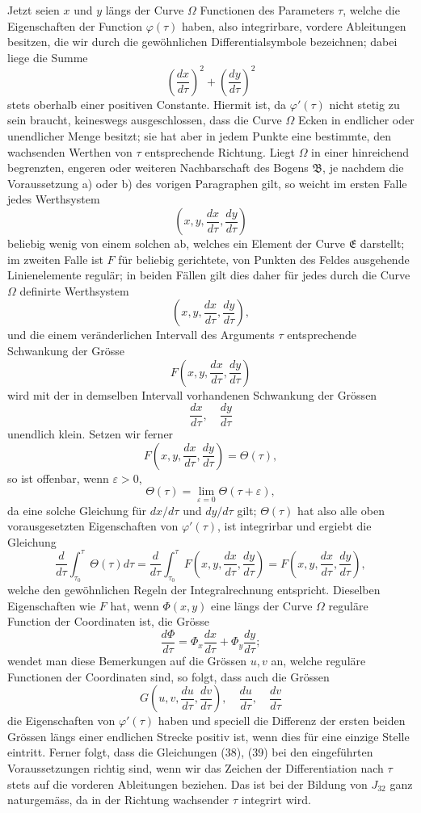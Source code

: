 \documentclass[11pt,a4paper,leqno]{article}
\begin{document}
Jetzt seien $x$ und $y$ längs der Curve $\Omega$ Functionen des Parameters $\tau$, welche die Eigenschaften der Function $\varphi(\tau)$ haben, also integrirbare, vordere Ableitungen besitzen, die wir durch die gewöhnlichen Differentialsymbole bezeichnen; dabei liege die Summe
\[
\left(\frac{dx}{d\tau}\right)^2+
\left(\frac{dy}{d\tau}\right)^2
\]
stets oberhalb einer positiven Constante. Hiermit ist, da $\varphi'(\tau)$ nicht stetig zu sein braucht, keineswegs ausgeschlossen, dass die
Curve $\Omega$ Ecken in endlicher oder unendlicher Menge besitzt; sie hat aber in jedem Punkte eine bestimmte, den wachsenden Werthen von $\tau$ entsprechende Richtung. Liegt $\Omega$ in einer hinreichend begrenzten, engeren oder weiteren Nachbarschaft des Bogens $\mathfrak{B}$, je nachdem die Voraussetzung a) oder b) des vorigen Paragraphen gilt, so weicht im ersten Falle jedes Werthsystem
\[
\left(x,y,\frac{dx}{d\tau},\frac{dy}{d\tau}\right)
\]
beliebig wenig von einem solchen ab, welches ein Element der Curve $\mathfrak{E}$ darstellt; im zweiten Falle ist $F$ für beliebig gerichtete, von Punkten des Feldes ausgehende Linienelemente regulär; in beiden Fällen gilt dies daher für jedes durch die Curve $\Omega$ definirte Werthsystem
\[
\left(x,y,\frac{dx}{d\tau},\frac{dy}{d\tau}\right),
\]
und die einem veränderlichen Intervall des Arguments $\tau$ entsprechende Schwankung der Grösse
\[
F\left(x,y,\frac{dx}{d\tau},\frac{dy}{d\tau}\right)
\]
wird mit der in demselben Intervall vorhandenen Schwankung der Grössen
\[
\frac{dx}{d\tau},\quad \frac{dy}{d\tau}
\]
unendlich klein. Setzen wir ferner
\[
F\left(x,y,\frac{dx}{d\tau},\frac{dy}{d\tau}\right)=\Theta(\tau),
\]
so ist offenbar, wenn $\varepsilon>0$,
\[
\Theta(\tau)=\lim_{\varepsilon=0}\Theta(\tau+\varepsilon),
\]
da eine solche Gleichung für $dx/d\tau$ und $dy/d\tau$ gilt; $\Theta(\tau)$ hat also alle oben vorausgesetzten Eigenschaften von $\varphi'(\tau)$, ist integrirbar und ergiebt die Gleichung
\[
\frac{d}{d\tau}\int_{\tau_0}^{\tau}\Theta(\tau)d\tau
=\frac{d}{d\tau}\int_{\tau_0}^{\tau}F\left(x,y,\frac{dx}{d\tau},\frac{dy}{d\tau}\right)
=F\left(x,y,\frac{dx}{d\tau},\frac{dy}{d\tau}\right),
\]
welche den gewöhnlichen Regeln der Integralrechnung entspricht. Dieselben Eigenschaften wie $F$ hat, wenn $\Phi(x,y)$ eine längs der Curve $\Omega$ reguläre Function der Coordinaten ist, die Grösse
\[
\frac{d\Phi}{d\tau}=\Phi_x\frac{dx}{d\tau}+\Phi_y\frac{dy}{d\tau};
\]
wendet man diese Bemerkungen auf die Grössen $u,v$ an, welche reguläre Functionen der Coordinaten sind, so folgt, dass auch die Grössen
\[
G\left(u,v,\frac{du}{d\tau},\frac{dv}{d\tau}\right),
\quad \frac{du}{d\tau},\quad \frac{dv}{d\tau}
\]
die Eigenschaften von $\varphi'(\tau)$ haben und speciell die Differenz der ersten beiden Grössen längs einer endlichen Strecke positiv ist, wenn dies für eine einzige Stelle eintritt. Ferner folgt, dass die Gleichungen (38), (39) bei den eingeführten Voraussetzungen richtig sind, wenn wir das Zeichen der Differentiation nach $\tau$ stets auf die vorderen Ableitungen beziehen. Das ist bei der Bildung von $J_{32}$ ganz naturgemäss, da in der Richtung wachsender $\tau$ integrirt wird.
\end{document}
